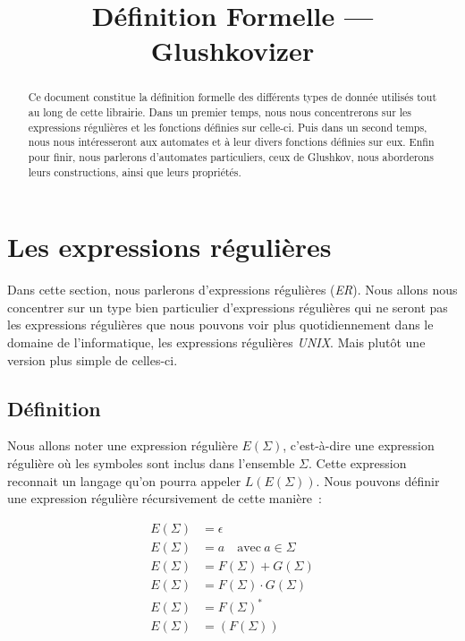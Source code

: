 \documentclass[12pt]{article}
\title{Définition Formelle --- Glushkovizer}
\author{}
\date{}
\begin{document}
\maketitle

\begin{abstract}
    Ce document constitue la définition formelle des différents types de donnée
    utilisés tout au long de cette librairie. Dans un premier temps, nous nous
    concentrerons sur les expressions régulières et les fonctions définies sur
    celle-ci. Puis dans un second temps, nous nous intéresseront aux automates
    et à leur divers fonctions définies sur eux. Enfin pour finir, nous
    parlerons d'automates particuliers, ceux de Glushkov, nous aborderons leurs
    constructions, ainsi que leurs propriétés.
\end{abstract}

\newpage

\section{Les expressions régulières}

Dans cette section, nous parlerons d'expressions régulières (\textit{ER}). Nous
allons nous concentrer sur un type bien particulier d'expressions régulières
qui ne seront pas les expressions régulières que nous pouvons voir plus
quotidiennement dans le domaine de l'informatique, les expressions régulières
\textit{UNIX}. Mais plutôt une version plus simple de celles-ci.

\subsection{Définition}

Nous allons noter une expression régulière \(E(\Sigma)\), c'est-à-dire une
expression régulière où les symboles sont inclus dans l'ensemble \(\Sigma\).
Cette expression reconnait un langage qu'on pourra appeler \(L(E(\Sigma))\).
Nous pouvons définir une expression régulière récursivement de cette manière~:

\begin{align}
    E(\Sigma) & = \epsilon                            \\
    E(\Sigma) & = a \quad \text{avec}~ a \in \Sigma   \\
    E(\Sigma) & = F(\Sigma) + G(\Sigma)               \\
    E(\Sigma) & = F(\Sigma) \cdot G(\Sigma)           \\
    E(\Sigma) & = F(\Sigma)^*                         \\
    E(\Sigma) & = (F(\Sigma))\label{align:parenthese}
\end{align}
\end{document}
